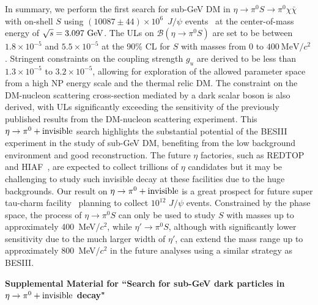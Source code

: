 \documentclass[
 reprint,
 amsmath,amssymb,a
 aps,
 twocolumn
]{revtex4-2}
\def \mevcc{~\mbox{MeV/$c^2$}}
\def \jpsi {J/\psi}
\begin{document}
In summary, we perform the first search for sub-GeV DM in $\eta\to\pi^0S\to\pi^0\chi\bar{\chi}$ with on-shell $S$ using $(10087\pm44)\times10^{6}$~$J/\psi$ events~\cite{BESIII:2021cxx} at the center-of-mass energy of $\sqrt{s}=3.097~\rm{GeV}$.
The ULs on $\mathcal{B}(\eta\to\pi^0S)$ are set to be between $1.8\times10^{-5}$ and $5.5\times10^{-5}$ at the 90\% CL for $S$ with masses from $0$ to $400\mevcc$. Stringent constraints on the coupling strength $g_u$ are derived to be less than $1.3\times10^{-5}$ to $3.2\times10^{-5}$, allowing for exploration of the allowed parameter space from a high NP energy scale and the thermal relic DM.
The constraint on the DM-nucleon scattering cross-section mediated by a dark scalar boson is also derived, with ULs significantly exceeding the sensitivity of the previously published results from the DM-nucleon scattering experiment.
This $\eta\to\pi^0+\rm{invisible}$ search highlights the substantial potential of the BESIII experiment in the study of sub-GeV DM, benefiting from the low background environment and good reconstruction. The future $\eta$ factories, such as REDTOP~\cite{REDTOP:2022slw} and HIAF~\cite{Chen:2024wad}, are expected to collect trillions of $\eta$ candidates but it may be challenging to study such invisible decay at these facilities due to the huge backgrounds.
Our result on $\eta\to\pi^0+\rm{invisible}$ is a great prospect for  future super tau-charm facility~\cite{Achasov:2023gey} planning to collect $10^{12}$ $\jpsi$ events.
Constrained by the phase space, the process of $\eta\to\pi^0S$ can only be used to study $S$ with masses up to approximately 400~MeV/$c^2$, while $\eta'\to\pi^0S$, although with significantly lower sensitivity due to the much larger width of $\eta'$, can extend the mass range up to approximately 800~MeV/$c^2$ in the future analyses using a similar strategy as BESIII.










\onecolumngrid

\clearpage
\newpage





\textbf{\boldmath\large Supplemental Material for ``Search for sub-GeV dark particles in $\eta\to\pi^0+\rm{invisible}$ decay"}
\end{document}

